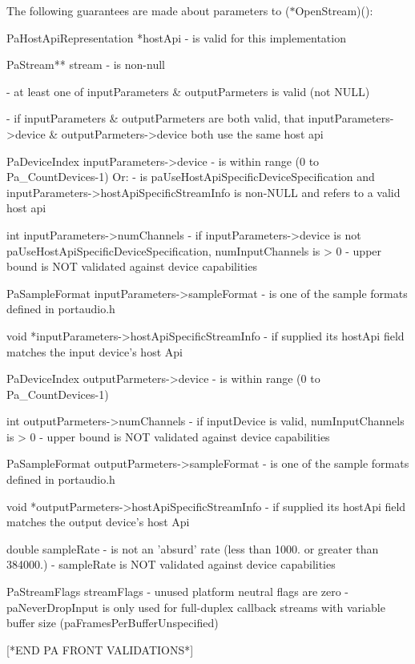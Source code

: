 The following guarantees are made about parameters to ($\ast$\+Open\+Stream)()\+: \begin{DoxyVerb}

PaHostApiRepresentation *hostApi
    - is valid for this implementation

PaStream** stream
    - is non-null

- at least one of inputParameters & outputParmeters is valid (not NULL)

- if inputParameters & outputParmeters are both valid, that
    inputParameters->device & outputParmeters->device  both use the same host api

PaDeviceIndex inputParameters->device
    - is within range (0 to Pa_CountDevices-1) Or:
    - is paUseHostApiSpecificDeviceSpecification and
        inputParameters->hostApiSpecificStreamInfo is non-NULL and refers
        to a valid host api

int inputParameters->numChannels
    - if inputParameters->device is not paUseHostApiSpecificDeviceSpecification, numInputChannels is > 0
    - upper bound is NOT validated against device capabilities

PaSampleFormat inputParameters->sampleFormat
    - is one of the sample formats defined in portaudio.h

void *inputParameters->hostApiSpecificStreamInfo
    - if supplied its hostApi field matches the input device's host Api

PaDeviceIndex outputParmeters->device
    - is within range (0 to Pa_CountDevices-1)

int outputParmeters->numChannels
    - if inputDevice is valid, numInputChannels is > 0
    - upper bound is NOT validated against device capabilities

PaSampleFormat outputParmeters->sampleFormat
    - is one of the sample formats defined in portaudio.h

void *outputParmeters->hostApiSpecificStreamInfo
    - if supplied its hostApi field matches the output device's host Api

double sampleRate
    - is not an 'absurd' rate (less than 1000. or greater than 384000.)
    - sampleRate is NOT validated against device capabilities

PaStreamFlags streamFlags
    - unused platform neutral flags are zero
    - paNeverDropInput is only used for full-duplex callback streams
        with variable buffer size (paFramesPerBufferUnspecified)

[*END PA FRONT VALIDATIONS*]
\end{DoxyVerb}


